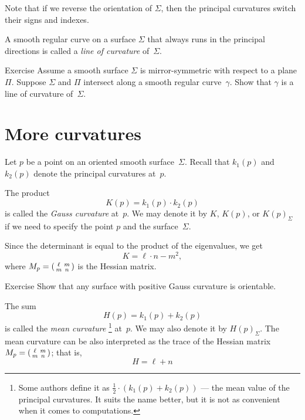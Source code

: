 Note that if we reverse the orientation of $\Sigma$, then the principal curvatures switch their signs and indexes.

A smooth regular curve on a surface $\Sigma$ that always runs in the principal directions is called a \emph{line of curvature} of~$\Sigma$. 

\begin{thm}{Exercise}\label{ex:line-of-curvature}
Assume a smooth surface $\Sigma$ is mirror-symmetric with respect to a plane $\Pi$.
Suppose $\Sigma$ and $\Pi$ intersect along a smooth regular curve~$\gamma$.
Show that $\gamma$ is a line of curvature of~$\Sigma$.
\end{thm}

\section{More curvatures}\label{sec:More curvatures}

Let $p$ be a point on an oriented smooth surface~$\Sigma$.
Recall that $k_1(p)$ and $k_2(p)$ denote the principal curvatures at~$p$.

The product 
\[K(p)=k_1(p)\cdot k_2(p)\]
is called the \emph{Gauss curvature} at~$p$.
We may denote it by $K$, $K(p)$, or $K(p)_\Sigma$ if we need to specify the point $p$ and the surface~$\Sigma$.

Since the determinant is equal to the product of the eigenvalues, we get
\[K=\ell\cdot n-m^2,\]
where 
$M_p\z=
(\begin{smallmatrix}
\ell&m
\\
m&n
\end{smallmatrix}
)
$ is the Hessian matrix.

\begin{thm}{Exercise}\label{ex:gauss+orientable}
Show that any surface with positive Gauss curvature is orientable. 
\end{thm}

The sum 
\[H(p)=k_1(p)+ k_2(p)\] 
is called the \emph{mean curvature}%
\footnote{Some authors define it as $\tfrac12\cdot(k_1(p)+ k_2(p))$ --- the mean value of the principal curvatures. It suits the name better, but it is not as convenient when it comes to computations.}
at~$p$.
We may also denote it by $H(p)_\Sigma$.
The mean curvature can be also interpreted as the trace of the Hessian matrix $M_p\z=
(\begin{smallmatrix}
\ell&m
\\
m&n
\end{smallmatrix}
)$;
that is,
\[H=\ell+n\] 

